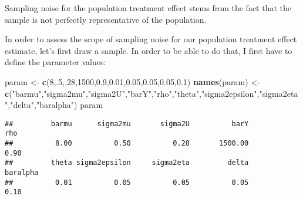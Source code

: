 \documentclass[]{book}
\newenvironment{Shaded}{\begin{snugshade}}{\end{snugshade}}
\newcommand{\DecValTok}[1]{\textcolor[rgb]{0.00,0.00,0.81}{#1}}
\newcommand{\FloatTok}[1]{\textcolor[rgb]{0.00,0.00,0.81}{#1}}
\newcommand{\KeywordTok}[1]{\textcolor[rgb]{0.13,0.29,0.53}{\textbf{#1}}}
\newcommand{\NormalTok}[1]{#1}
\newcommand{\StringTok}[1]{\textcolor[rgb]{0.31,0.60,0.02}{#1}}
\theoremstyle{definition}
\theoremstyle{definition}
\theoremstyle{definition}
\theoremstyle{remark}
\let\BeginKnitrBlock\begin \let\EndKnitrBlock\end
\begin{document}
Sampling noise for the population treatment effect stems from the fact that the sample is not perfectly representative of the population.

\BeginKnitrBlock{example}
\protect\hypertarget{exm:unnamed-chunk-33}{}{\label{exm:unnamed-chunk-33} }In order to assess the scope of sampling noise for our population treatment effect estimate, let's first draw a sample.
In order to be able to do that, I first have to define the parameter values:
\EndKnitrBlock{example}

\begin{Shaded}
\begin{Highlighting}[]
\NormalTok{param <-}\StringTok{ }\KeywordTok{c}\NormalTok{(}\DecValTok{8}\NormalTok{,.}\DecValTok{5}\NormalTok{,.}\DecValTok{28}\NormalTok{,}\DecValTok{1500}\NormalTok{,}\FloatTok{0.9}\NormalTok{,}\FloatTok{0.01}\NormalTok{,}\FloatTok{0.05}\NormalTok{,}\FloatTok{0.05}\NormalTok{,}\FloatTok{0.05}\NormalTok{,}\FloatTok{0.1}\NormalTok{)}
\KeywordTok{names}\NormalTok{(param) <-}\StringTok{ }\KeywordTok{c}\NormalTok{(}\StringTok{"barmu"}\NormalTok{,}\StringTok{"sigma2mu"}\NormalTok{,}\StringTok{"sigma2U"}\NormalTok{,}\StringTok{"barY"}\NormalTok{,}\StringTok{"rho"}\NormalTok{,}\StringTok{"theta"}\NormalTok{,}\StringTok{"sigma2epsilon"}\NormalTok{,}\StringTok{"sigma2eta"}\NormalTok{,}\StringTok{"delta"}\NormalTok{,}\StringTok{"baralpha"}\NormalTok{)}
\NormalTok{param}
\end{Highlighting}
\end{Shaded}

\begin{verbatim}
##         barmu      sigma2mu       sigma2U          barY           rho 
##          8.00          0.50          0.28       1500.00          0.90 
##         theta sigma2epsilon     sigma2eta         delta      baralpha 
##          0.01          0.05          0.05          0.05          0.10
\end{verbatim}
\end{document}
